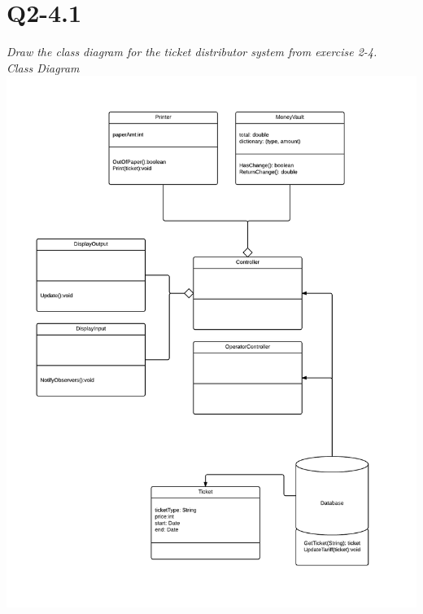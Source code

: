 \section{Q2-4.1}
\emph{Draw the class diagram for the ticket distributor system from exercise 2-4.}
\\
\emph{Class Diagram}
\\
\includegraphics[scale=0.28]{Assignment-36-Class-Diagram}
